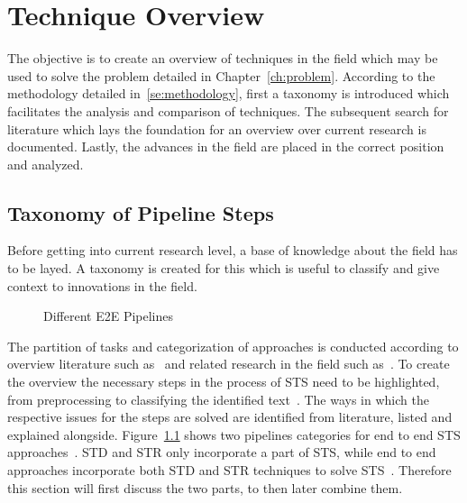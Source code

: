 \chapter{Technique Overview}\label{ch:research}
The objective is to create an overview of techniques in the field which may be used to solve the
problem detailed in Chapter~\ref{ch:problem}.
According to the methodology detailed in~\ref{se:methodology}, first a taxonomy is introduced
which facilitates the analysis and comparison of techniques.
The subsequent search for literature which lays the foundation for an overview over current research
is documented.
Lastly, the advances in the field are placed in the correct position and analyzed.

\section{Taxonomy of Pipeline Steps}
Before getting into current research level, a base of knowledge about the field has to be layed.
A taxonomy is created for this which is useful to classify and give context to innovations in the
field.
\begin{figure}[b]
    \centering
    
    \caption{Different E2E Pipelines\label{fig:e2e-pipelines}}
\end{figure}
The partition of tasks and categorization of approaches is conducted according to overview literature
such as~\cite{long_scene_2021,chen_text_2021,cong_comparative_2019} and related research in the
field such as~\cite{qiao_text_2021,sheng_centripetaltext_2021,liu_accurate_2020,deng_pixellink_2018}.
To create the overview the necessary steps in the process of \ac{STS} need to be highlighted,
from preprocessing to classifying the identified
text~\citep{long_scene_2021, sourvanos_challenges_2018}.
The ways in which the respective issues for the steps are solved are identified from literature,
listed and explained alongside.
Figure~\ref{fig:e2e-pipelines} shows two pipelines categories for end to end \ac{STS}
approaches~\citep{long_scene_2021}.
\ac{STD} and \ac{STR} only incorporate a part of \ac{STS}, while end to end approaches
incorporate both \ac{STD} and \ac{STR} techniques to solve \ac{STS}~\citep{long_scene_2021}.
Therefore this section will first discuss the two parts, to then later combine them.

